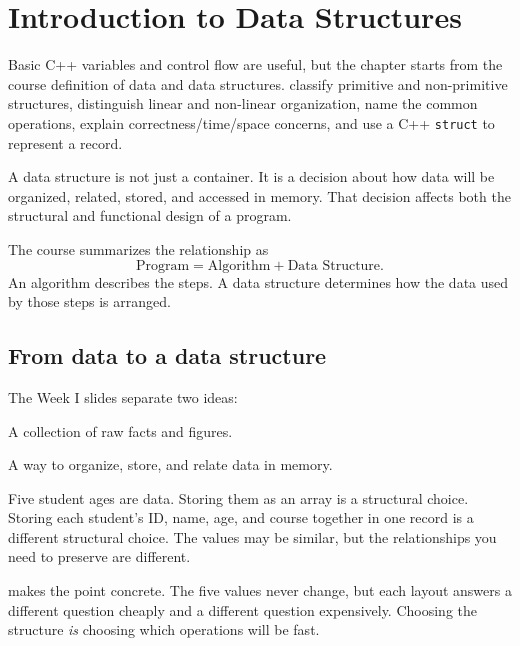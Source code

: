 \chapter{Introduction to Data Structures}\label{ch:introduction}

\chapterguide%
  {Basic C++ variables and control flow are useful, but the chapter starts from the course definition of data and data structures.}
  {classify primitive and non-primitive structures, distinguish linear and non-linear organization, name the common operations, explain correctness/time/space concerns, and use a C++ \texttt{struct} to represent a record.}

A data structure is not just a container. It is a decision about how data will be organized, related, stored, and accessed in memory. That decision affects both the structural and functional design of a program.

\begin{keyidea}
The course summarizes the relationship as
\[
\text{Program} = \text{Algorithm} + \text{Data Structure}.
\]
An algorithm describes the steps. A data structure determines how the data used by those steps is arranged.
\end{keyidea}

\section{From data to a data structure}

The Week I slides separate two ideas:

\begin{description}[leftmargin=1.4in,style=nextline]
  \item[Data] A collection of raw facts and figures.
  \item[Data structure] A way to organize, store, and relate data in memory.
\end{description}

\begin{intuition}
Five student ages are data. Storing them as an array is a structural choice. Storing each student's ID, name, age, and course together in one record is a different structural choice. The values may be similar, but the relationships you need to preserve are different.
\end{intuition}

 makes the point concrete. The five values never change, but each layout
answers a different question cheaply and a different question expensively. Choosing the
structure \emph{is} choosing which operations will be fast.

